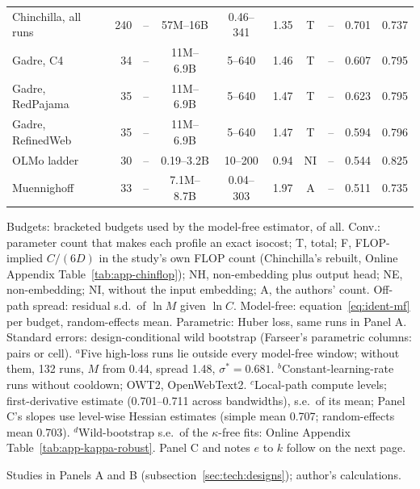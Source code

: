 \begin{table}[tp]
\begin{tabular*}{\textwidth}{@{\extracolsep{\fill}}lrcccccccc@{}}
Chinchilla, all runs & 240 & -- & 57M--16B & 0.46--341 & 1.35 & T & -- & 0.701 & 0.737 \\
Gadre, C4 & 34 & -- & 11M--6.9B & 5--640 & 1.46 & T & -- & 0.607 & 0.795 \\
Gadre, RedPajama & 35 & -- & 11M--6.9B & 5--640 & 1.47 & T & -- & 0.623 & 0.795 \\
Gadre, RefinedWeb & 35 & -- & 11M--6.9B & 5--640 & 1.47 & T & -- & 0.594 & 0.796 \\
OLMo ladder & 30 & -- & 0.19--3.2B & 10--200 & 0.94 & NI & -- & 0.544 & 0.825 \\
Muennighoff & 33 & -- & 7.1M--8.7B & 0.04--303 & 1.97 & A & -- & 0.511 & 0.735 \\
\bottomrule
\end{tabular*}

\begin{tablenotes}
Budgets: bracketed budgets used by the model-free estimator, of all. Conv.: parameter count that makes
each profile an exact isocost; T, total; F, FLOP-implied $C/(6D)$ in the study's own FLOP count (Chinchilla's rebuilt,
Online Appendix Table~\ref{tab:app-chinflop}); NH, non-embedding plus output head; NE,
non-embedding; NI, without the input embedding; A, the authors' count. Off-path spread: residual s.d.\ of $\ln M$ given
$\ln C$. Model-free: equation~\eqref{eq:ident-mf} per budget, random-effects mean. Parametric: Huber loss,
same runs in Panel A. Standard errors: design-conditional wild bootstrap (Farseer's parametric columns: pairs or cell).
$^{a}$Five high-loss runs lie outside every model-free window; without them, 132 runs, $M$ from 0.44, spread 1.48,
$\sigma^*=0.681$.
$^{b}$Constant-learning-rate runs without cooldown; OWT2, OpenWebText2.
$^{c}$Local-path compute levels; first-derivative estimate (0.701--0.711 across bandwidths), s.e.\ of its mean;
Panel C's slopes use level-wise Hessian estimates (simple mean 0.707; random-effects mean 0.703).
$^{d}$Wild-bootstrap s.e.\ of the $\kappa$-free fits: Online Appendix Table~\ref{tab:app-kappa-robust}.
Panel C and notes $e$ to $k$ follow on the next page.
\end{tablenotes}

\begin{tablenotes}[Source]
Studies in Panels A and B (subsection~\ref{sec:tech:designs}); author's calculations.
\end{tablenotes}
\end{table}

